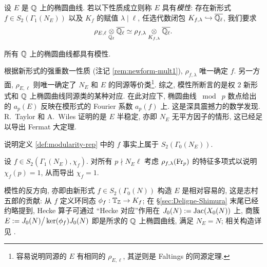 \begin{definition}\label{def:modularity-rep}
	设 $E$ 是 $\mathbb{Q}$ 上的椭圆曲线. 若以下性质成立则称 $E$ 具有\emph{模性}: 存在新形式 $f \in S_2\left(\Gamma_1(N_E)\right)$ 以及 $K_f$ 的赋值 $\lambda \mid \ell$, 任选代数闭包 $K_{f, \lambda} \hookrightarrow \overline{\mathbb{Q}_\ell}$, 我们要求
	\[ \rho_{E, \ell} \underset{\mathbb{Q}_\ell}{\otimes} \overline{\mathbb{Q}_\ell} \simeq \rho_{f, \lambda} \underset{K_{f, \lambda}}{\otimes} \overline{\mathbb{Q}_\ell}. \]
\end{definition}

\begin{theorem}
	所有 $\mathbb{Q}$ 上的椭圆曲线都具有模性.
\end{theorem}

根据新形式的强重数一性质 (注记 \ref{rem:newform-mult1}), $\rho_{f, \lambda}$ 唯一确定 $f$. 另一方面, $\rho_{E, \ell}$ 则唯一确定了 $N_E$ 和 $E$ 的同源等价类\footnote{容易说明同源的 $E$ 有相同的 $\rho_{E, \ell}$, 其逆则是 Faltings 的同源定理.}. 综之, 模性所断言的是权 $2$ 新形式和 $\mathbb{Q}$ 上椭圆曲线同源类的某种对应. 在此对应下, 椭圆曲线 $\bmod\; p$ 数点给出的 $a_p(E)$ 反映在模形式的 Fourier 系数 $a_p(f)$ 上. 这是深具震撼力的数学发现. R.\ Taylor 和 A.\ Wiles 证明的是 $E$ 半稳定, 亦即 $N_E$ 无平方因子的情形, 这已经足以导出 Fermat 大定理. 

\begin{exercise}
	说明定义 \ref{def:modularity-rep} 中的 $f$ 事实上属于 $S_2\left(\Gamma_0(N_E)\right)$.
	
	\begin{hint}
		设 $f \in S_2(\Gamma_1(N_E), \chi_f)$. 对所有 $p \nmid N_E \ell$ 考虑 $\rho_{f, \lambda}(\operatorname{Fr}_p)$ 的特征多项式以说明 $\chi_f(p) = 1$, 从而导出 $\chi_f = 1$.
	\end{hint}
\end{exercise}

模性的反方向, 亦即由新形式 $f \in S_2(\Gamma_0(N))$ 构造 $E$ 是相对容易的, 这是志村五郎的贡献: 从 $f$ 定义环同态 $\phi_f: \mathbb{T}_{\mathbb{Z}} \to K_f$; 在 \S\ref{sec:Deligne-Shimura} 末尾已经约略提到, Hecke 算子可通过 ``Hecke 对应''作用在 $J_0(N) := \operatorname{Jac}(X_0(N))$ 上, 商簇 $E := J_0(N) \big/ \operatorname{ker}(\phi_f)J_0(N)$ 即是所求的 $\mathbb{Q}$ 上椭圆曲线, 满足 $N_E = N$; 相关构造详见 \cite[Chapters 6---7]{DS05}.

